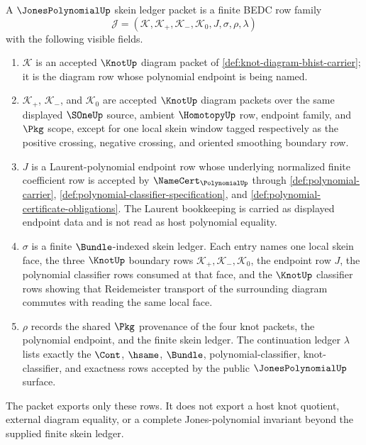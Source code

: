 \begin{definition}
\label{def:jonespolynomial-skein-ledger-packet}
A $\JonesPolynomialUp$ skein ledger packet is a finite BEDC row family
$$
\mathcal{J}=(\mathcal{K},\mathcal{K}_+,\mathcal{K}_-,\mathcal{K}_0,J,\sigma,\rho,\lambda)
$$
with the following visible fields.
\begin{enumerate}
  \item $\mathcal{K}$ is an accepted $\KnotUp$ diagram packet of
  \autoref{def:knot-diagram-bhist-carrier}; it is the diagram row whose
  polynomial endpoint is being named.
  \item $\mathcal{K}_+$, $\mathcal{K}_-$, and $\mathcal{K}_0$ are accepted
  $\KnotUp$ diagram packets over the same displayed $\SOneUp$ source,
  ambient $\HomotopyUp$ row, endpoint family, and $\Pkg$ scope, except for
  one local skein window tagged respectively as the positive crossing,
  negative crossing, and oriented smoothing boundary row.
  \item $J$ is a Laurent-polynomial endpoint row whose underlying normalized
  finite coefficient row is accepted by $\NameCert_{\PolynomialUp}$ through
  \autoref{def:polynomial-carrier},
  \autoref{def:polynomial-classifier-specification}, and
  \autoref{def:polynomial-certificate-obligations}. The Laurent bookkeeping is
  carried as displayed endpoint data and is not read as host polynomial
  equality.
  \item $\sigma$ is a finite $\Bundle$-indexed skein ledger. Each entry names
  one local skein face, the three $\KnotUp$ boundary rows
  $\mathcal{K}_+,\mathcal{K}_-,\mathcal{K}_0$, the endpoint row $J$, the
  polynomial classifier rows consumed at that face, and the $\KnotUp$
  classifier rows showing that Reidemeister transport of the surrounding
  diagram commutes with reading the same local face.
  \item $\rho$ records the shared $\Pkg$ provenance of the four knot packets,
  the polynomial endpoint, and the finite skein ledger. The continuation
  ledger $\lambda$ lists exactly the $\Cont$, $\hsame$, $\Bundle$,
  polynomial-classifier, knot-classifier, and exactness rows accepted by the
  public $\JonesPolynomialUp$ surface.
\end{enumerate}
The packet exports only these rows. It does not export a host knot quotient,
external diagram equality, or a complete Jones-polynomial invariant beyond the
supplied finite skein ledger.
\end{definition}

